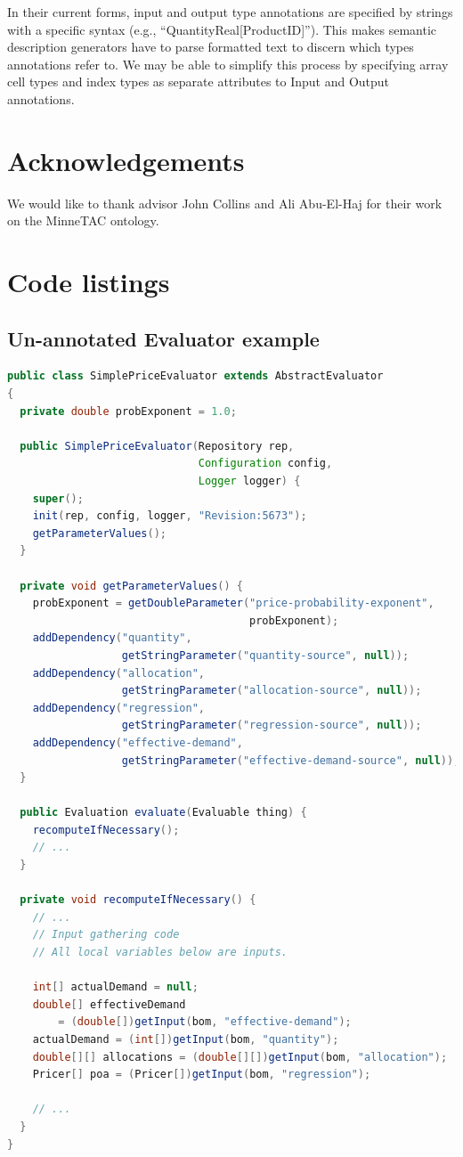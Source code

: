 \documentclass{article}
\begin{document}
In their current forms, input and output type annotations are specified by strings with a specific syntax (e.g., ``QuantityReal[ProductID]'').
This makes semantic description generators have to parse formatted text to discern which types annotations refer to.
We may be able to simplify this process by specifying array cell types and index types as separate attributes to Input and Output annotations.

\section*{Acknowledgements}

We would like to thank advisor John Collins and Ali Abu-El-Haj for their work on the MinneTAC ontology.

\clearpage



\clearpage
\appendix

\section{Code listings}

\subsection{Un-annotated Evaluator example}
\label{sec:unannotatedeval}

{\small
\begin{lstlisting}[language={Java}]
public class SimplePriceEvaluator extends AbstractEvaluator
{
  private double probExponent = 1.0;

  public SimplePriceEvaluator(Repository rep,
                              Configuration config,
                              Logger logger) {
    super();
    init(rep, config, logger, "Revision:5673");
    getParameterValues();
  }

  private void getParameterValues() {
    probExponent = getDoubleParameter("price-probability-exponent",
                                      probExponent);
    addDependency("quantity",
                  getStringParameter("quantity-source", null));
    addDependency("allocation",
                  getStringParameter("allocation-source", null));
    addDependency("regression",
                  getStringParameter("regression-source", null));
    addDependency("effective-demand",
                  getStringParameter("effective-demand-source", null));
  }

  public Evaluation evaluate(Evaluable thing) {
    recomputeIfNecessary();
    // ...
  }

  private void recomputeIfNecessary() {
    // ...
    // Input gathering code
    // All local variables below are inputs.

    int[] actualDemand = null;
    double[] effectiveDemand
        = (double[])getInput(bom, "effective-demand");
    actualDemand = (int[])getInput(bom, "quantity");
    double[][] allocations = (double[][])getInput(bom, "allocation");
    Pricer[] poa = (Pricer[])getInput(bom, "regression");

    // ...
  }
}
\end{lstlisting}
}
\end{document}
